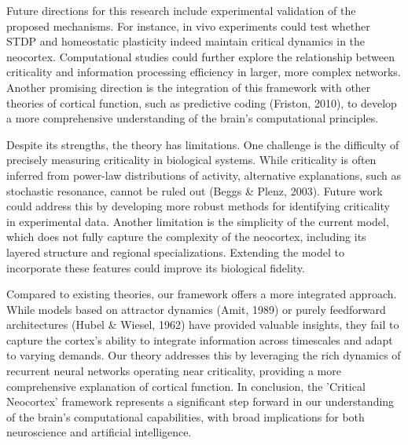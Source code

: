 \documentclass{article}
\begin{document}
Future directions for this research include experimental validation of the proposed mechanisms. For instance, in vivo experiments could test whether STDP and homeostatic plasticity indeed maintain critical dynamics in the neocortex. Computational studies could further explore the relationship between criticality and information processing efficiency in larger, more complex networks. Another promising direction is the integration of this framework with other theories of cortical function, such as predictive coding (Friston, 2010), to develop a more comprehensive understanding of the brain's computational principles.

Despite its strengths, the theory has limitations. One challenge is the difficulty of precisely measuring criticality in biological systems. While criticality is often inferred from power-law distributions of activity, alternative explanations, such as stochastic resonance, cannot be ruled out (Beggs & Plenz, 2003). Future work could address this by developing more robust methods for identifying criticality in experimental data. Another limitation is the simplicity of the current model, which does not fully capture the complexity of the neocortex, including its layered structure and regional specializations. Extending the model to incorporate these features could improve its biological fidelity.

Compared to existing theories, our framework offers a more integrated approach. While models based on attractor dynamics (Amit, 1989) or purely feedforward architectures (Hubel & Wiesel, 1962) have provided valuable insights, they fail to capture the cortex's ability to integrate information across timescales and adapt to varying demands. Our theory addresses this by leveraging the rich dynamics of recurrent neural networks operating near criticality, providing a more comprehensive explanation of cortical function. In conclusion, the 'Critical Neocortex' framework represents a significant step forward in our understanding of the brain's computational capabilities, with broad implications for both neuroscience and artificial intelligence.
\end{document}
